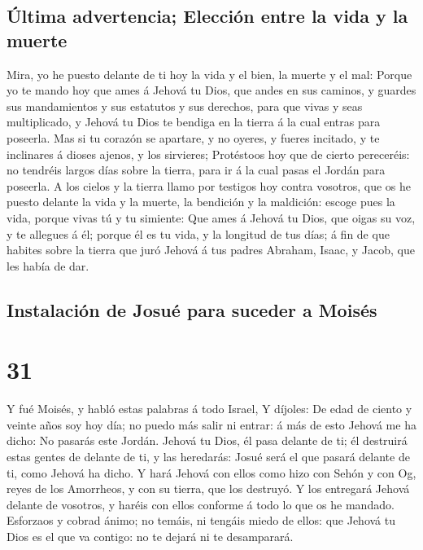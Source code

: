 \hypertarget{uxfaltima-advertencia-elecciuxf3n-entre-la-vida-y-la-muerte}{%
\subsection{Última advertencia; Elección entre la vida y la
muerte}\label{uxfaltima-advertencia-elecciuxf3n-entre-la-vida-y-la-muerte}}

 Mira, yo he puesto delante de ti hoy la vida y el bien, la
muerte y el mal:  Porque yo te mando hoy que ames á Jehová
tu Dios, que andes en sus caminos, y guardes sus mandamientos y sus
estatutos y sus derechos, para que vivas y seas multiplicado, y Jehová
tu Dios te bendiga en la tierra á la cual entras para poseerla.
 Mas si tu corazón se apartare, y no oyeres, y fueres
incitado, y te inclinares á dioses ajenos, y los sirvieres;
 Protéstoos hoy que de cierto pereceréis: no tendréis
largos días sobre la tierra, para ir á la cual pasas el Jordán para
poseerla.  A los cielos y la tierra llamo por testigos hoy
contra vosotros, que os he puesto delante la vida y la muerte, la
bendición y la maldición: escoge pues la vida, porque vivas tú y tu
simiente:  Que ames á Jehová tu Dios, que oigas su voz, y
te allegues á él; porque él es tu vida, y la longitud de tus días; á fin
de que habites sobre la tierra que juró Jehová á tus padres Abraham,
Isaac, y Jacob, que les había de dar.

\hypertarget{instalaciuxf3n-de-josuuxe9-para-suceder-a-moisuxe9s}{%
\subsection{Instalación de Josué para suceder a
Moisés}\label{instalaciuxf3n-de-josuuxe9-para-suceder-a-moisuxe9s}}

\hypertarget{section-30}{%
\section{31}\label{section-30}}

 Y fué Moisés, y habló estas palabras á todo Israel,
 Y díjoles: De edad de ciento y veinte años soy hoy día; no
puedo más salir ni entrar: á más de esto Jehová me ha dicho: No pasarás
este Jordán.  Jehová tu Dios, él pasa delante de ti; él
destruirá estas gentes de delante de ti, y las heredarás: Josué será el
que pasará delante de ti, como Jehová ha dicho.  Y hará
Jehová con ellos como hizo con Sehón y con Og, reyes de los Amorrheos, y
con su tierra, que los destruyó.  Y los entregará Jehová
delante de vosotros, y haréis con ellos conforme á todo lo que os he
mandado.  Esforzaos y cobrad ánimo; no temáis, ni tengáis
miedo de ellos: que Jehová tu Dios es el que va contigo: no te dejará ni
te desamparará.

